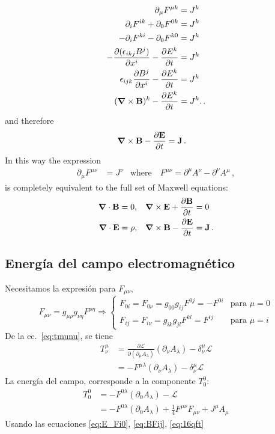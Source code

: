 \begin{align}
\partial_\mu F^{\mu k}&=J^k\nonumber\\
\partial_iF^{ik}+\partial_0F^{0k}&=J^k\nonumber\\
-\partial_iF^{ki}-\partial_0F^{k0}&=J^k\nonumber\\
  -\frac{\partial (\epsilon_{ikj}B^j)}{\partial x^{i}}-\frac{\partial E^k}{\partial t}&=J^k\nonumber\\
\epsilon_{ijk}\frac{\partial B^j}{\partial x^{i}}-\frac{\partial E^k}{\partial t}&=J^k\nonumber\\
(\boldsymbol{\nabla}\times \mathbf{B})^k-\frac{\partial E^k}{\partial t}&=J^k.\,.
\end{align}
and therefore
\begin{align}
  \boldsymbol{\nabla}\times \mathbf{B}-\frac{\partial\mathbf{E}}{\partial t}&=\mathbf{J}\,.
\end{align}
In this way the expression
\begin{align}
   \partial_\mu F^{\mu\nu}&=J^\nu& \text{where}\quad    F^{\mu\nu}=\partial^\mu A^\nu-\partial^\nu A^\mu\,,
\end{align}
is completely equivalent to the full set of Maxwell equations:
\begin{align}
  \label{eq:hom_m_eq}
  \boldsymbol{\nabla}\cdot\mathbf{B}&=0,&\boldsymbol{\nabla}\times \mathbf{E}+\frac{\partial\mathbf{B}}{\partial t}&=0\\
  \label{eq:inhom_m_eq}
  \boldsymbol{\nabla}\cdot\mathbf{E}&=\rho,&\boldsymbol{\nabla}\times \mathbf{B}-\frac{\partial\mathbf{E}}{\partial t}&=\mathbf{J}\,.
\end{align}

\subsection{Energía del campo electromagnético}
Necesitamos la expresión para $F_{\mu\nu}$,
\begin{equation}
  \label{eq:16qft}
  F_{\mu\nu}=g_{\mu\rho}g_{\nu\eta}F^{\rho\eta}\Rightarrow
  \begin{cases}
    F_{0i}=F_{0\nu}=g_{00}g_{ij}F^{0j}=-F^{0i} &\text{para $\mu=0$}\\
    F_{ij}=F_{i\nu}=g_{ik}g_{jl}F^{kl}=F^{ij} &\text{para $\mu=i$}
  \end{cases}
\end{equation}
De la ec.~\eqref{eq:tmunu}, se tiene
\begin{align}
  T^\mu_\nu&=\frac{\partial\mathcal{L}}{\partial(\partial_\mu A_\lambda)}(\partial_\nu A_\lambda)
  -\delta^\mu_\nu\mathcal{L}\nonumber\\
  &=-F^{\mu\lambda}(\partial_\nu A_\lambda)-\delta^\mu_\nu\mathcal{L}
\end{align}
La energía del campo, corresponde a la componente $T^0_0$:
\begin{align}
\label{eq:17qft}
  T^0_0&=-F^{0\lambda}(\partial_0A_\lambda)-\mathcal{L}\nonumber\\
  &=-F^{0\lambda}(\partial_0A_\lambda)+\frac{1}{4}F^{\mu\nu}F_{\mu\nu}+J^\mu A_\mu\nonumber
\end{align}
Usando las ecuaciones 
\eqref{eq:E_Fi0}, %
\eqref{eq:BFij}, \eqref{eq:16qft}

